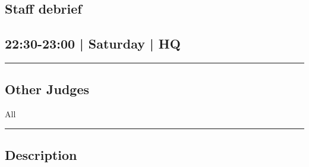 \documentclass[10pt, A5]{article}
\begin{document}
	

		\begin{framed}
			\begin{minipage}{\textwidth}

			\setcounter{section}{87}
							\section{Staff debrief}
						
			\subsection*{22:30-23:00 | Saturday | HQ}

			\vspace{0.25cm}
			\hrule
			\vspace{0.25cm}


			\subsection*{Other Judges}
							All

					\vspace{0.25cm}
			\hrule
			\vspace{0.25cm}

			\begin{minipage}{\textwidth}
			\subsection*{\faListAlt \: Description}
			
			\end{minipage}


	\end{minipage}
	\end{framed}

	
\end{document}
